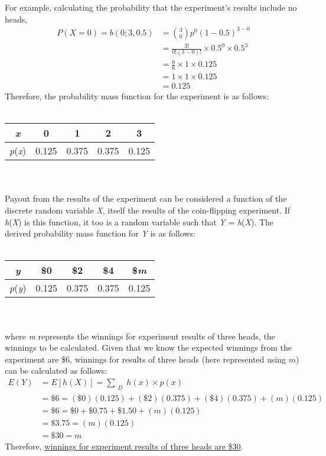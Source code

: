 \documentclass[12pt,a4paper]{article}
\numberwithin{equation}{subsection}
\def\doubleunderline#1{\underline{\underline{#1}}}
\begin{document}
\begin{enumerate}
For example, calculating the probability that the experiment's results include no heads,
\begin{equation*}
\begin{split}
P(X = 0) = b(0; 3, 0.5) & = \binom{3}{0}p^{0}(1 - 0.5)^{3 - 0} \\
& = \frac{3!}{0!(3 - 0)!} \times 0.5^{0} \times 0.5^{3} \\
& = \frac{6}{6} \times 1 \times 0.125 \\
& = 1 \times 1 \times 0.125 \\
& = 0.125
\end{split}
\end{equation*}
Therefore, the probability mass function for the experiment is as follows: \\ \\
\begin{tabular}{c|cccc}
\textit{x} & 0 & 1 & 2 & 3 \\
\hline
\textit{p}(\textit{x}) & 0.125 & 0.375 & 0.375 & 0.125 \\
\end{tabular} \\ \\
Payout from the results of the experiment can be considered a function of the discrete random variable \textit{X}, itself the results of the coin-flipping experiment.  If \textit{h}(\textit{X}) is this function, it too is a random variable such that \textit{Y} = \textit{h}(\textit{X}).  The derived probability mass function for \textit{Y} is as follows: \\ \\
\begin{tabular}{c|cccc}
\textit{y} & \$0 & \$2 & \$4 & \$\textit{m} \\
\hline
\textit{p}(\textit{y}) & 0.125 & 0.375 & 0.375 & 0.125 \\
\end{tabular} \\ \\
where \textit{m} represents the winnings for experiment results of three heads, the winnings to be calculated.  Given that we know the expected winnings from the experiment are \$6, winnings for results of three heads (here represented using $m$) can be calculated as follows:
\begin{equation*}
\begin{split}
E(Y) & = E[h(X)] = \sum_{\substack{D}}h(x) \times p(x) \\
& = \$6 = (\$0)(0.125) + (\$2)(0.375) + (\$4)(0.375) + (\textit{m})(0.125) \\
& = \$6 = \$0 + \$0.75 + \$1.50 + (\textit{m})(0.125) \\
& = \$3.75 = (\textit{m})(0.125) \\
& = \$30 = \textit{m}
\end{split}
\end{equation*}
Therefore, \doubleunderline{winnings for experiment results of three heads are \$30}.


\end{enumerate}
\end{document}
